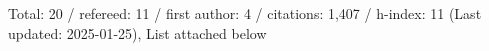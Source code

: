 Total: 20 / refereed: 11 / first author: 4 / citations: 1,407 / h-index: 11 (Last updated: 2025-01-25), List attached below